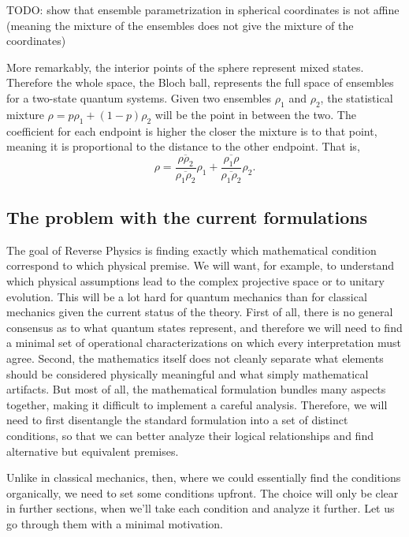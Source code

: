 TODO: show that ensemble parametrization in spherical coordinates is not affine (meaning the mixture of the ensembles does not give the mixture of the coordinates)

More remarkably, the interior points of the sphere represent mixed states. Therefore the whole space, the Bloch ball, represents the full space of ensembles for a two-state quantum systems. Given two ensembles $\rho_1$ and $\rho_2$, the statistical mixture $\rho = p \rho_1 + (1-p) \rho_2$ will be the point in between the two. The coefficient for each endpoint is higher the closer the mixture is to that point, meaning it is proportional to the distance to the other endpoint. That is,
\begin{equation}
	\rho = \frac{\overline{\rho \rho_2}}{\overline{\rho_1 \rho_2}} \rho_1 + \frac{\overline{\rho_1 \rho}}{\overline{\rho_1 \rho_2}} \rho_2.
\end{equation}

\subsection{The problem with the current formulations}

The goal of Reverse Physics is finding exactly which mathematical condition correspond to which physical premise. We will want, for example, to understand which physical assumptions lead to the complex projective space or to unitary evolution. This will be a lot hard for quantum mechanics than for classical mechanics given the current status of the theory. First of all, there is no general consensus as to what quantum states represent, and therefore we will need to find a minimal set of operational characterizations on which every interpretation must agree. Second, the mathematics itself does not cleanly separate what elements should be considered physically meaningful and what simply mathematical artifacts. But most of all, the mathematical formulation bundles many aspects together, making it difficult to implement a careful analysis. Therefore, we will need to first disentangle the standard formulation into a set of distinct conditions, so that we can better analyze their logical relationships and find alternative but equivalent premises.

Unlike in classical mechanics, then, where we could essentially find the conditions organically, we need to set some conditions upfront. The choice will only be clear in further sections, when we'll take each condition and analyze it further. Let us go through them with a minimal motivation.

